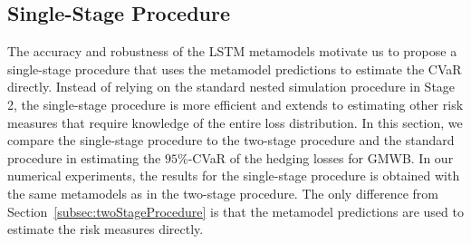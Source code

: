 \subsection{Single-Stage Procedure}

The accuracy and robustness of the LSTM metamodels motivate us to propose a single-stage procedure that uses the metamodel predictions to estimate the CVaR directly. 
Instead of relying on the standard nested simulation procedure in Stage 2, the single-stage procedure is more efficient and extends to estimating other risk measures that require knowledge of the entire loss distribution.
In this section, we compare the single-stage procedure to the two-stage procedure and the standard procedure in estimating the $95\%$-CVaR of the hedging losses for GMWB.
In our numerical experiments, the results for the single-stage procedure is obtained with the same metamodels as in the two-stage procedure.
The only difference from Section~\ref{subsec:twoStageProcedure} is that the metamodel predictions are used to estimate the risk measures directly.

